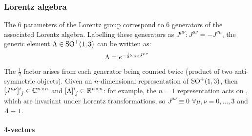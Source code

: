 \subsubsection{Lorentz algebra}

The 6 parameters of the Lorentz group correspond to 6 generators of the associated Lorentz algebra. Labelling these generators as $ J^{\mu \nu} : J^{\mu \nu} = - J^{\nu \mu} $, the generic element $ \Lambda \in \mathrm{SO}^+(1,3) $ can be written as:
\begin{equation}
  \Lambda = e^{- \frac{\mathrm{i}}{2} \omega_{\mu \nu} J^{\mu \nu}}
\end{equation}
The $ \frac{1}{2} $ factor arises from each generator being counted twice (product of two anti-symmetric objects). Given an $ n $-dimensional representation of $ \mathrm{SO}^+(1,3) $, then $ \tensor{[J^{\mu \nu}]}{^i_j} \in \C^{n \times n} $ and $ \tensor{[\Lambda]}{^i_j} \in \R^{n \times n} $: for example, the $ n = 1 $ representation acts on , which are invariant under Lorentz transformations, so $ J^{\mu \nu} \equiv 0 \,\,\forall \mu,\nu = 0, \dots, 3 $ and $ \Lambda \equiv 1 $.

\paragraph{4-vectors}

